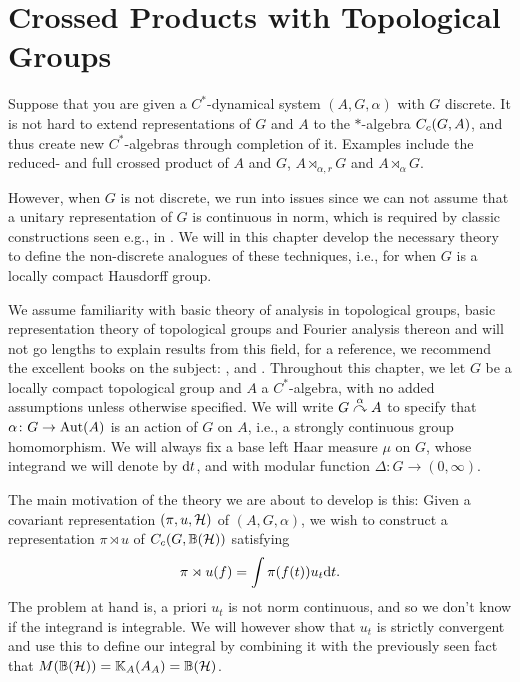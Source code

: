 \chapter{Crossed Products with Topological Groups}
Suppose that you are given a $C^*$-dynamical system $(A,G,\alpha)$ with $G$ discrete. It is not hard to extend representations of $G$ and $A$ to the $*$-algebra $C_c(G,A)$, and thus create new $C^*$-algebras through completion of it. Examples include the reduced- and full crossed product of $A$ and $G$, $A \rtimes_{\alpha,r} G$ and $A \rtimes_{\alpha} G$.

However, when $G$ is not discrete, we run into issues since we can not assume that a unitary representation of $G$ is continuous in norm, which is required by classic constructions seen e.g., in \cite{brown2008c}. We will in this chapter develop the necessary theory to define the non-discrete analogues of these techniques, i.e., for when $G$ is a locally compact Hausdorff group.

We assume familiarity with basic theory of analysis in topological groups, basic representation theory of topological groups and Fourier analysis thereon and will not go lengths to explain results from this field, for a reference, we recommend the excellent books on the subject: \cite{folland2016fourier}, \cite{berg1984harmonic} and \cite{folland2013real}. 
Throughout this chapter, we let $G$ be a locally compact topological group and $A$ a $C^*$-algebra, with no added assumptions unless otherwise specified. We will write $G \stackrel{\alpha}{\curvearrowright} A$ to specify that $\alpha \colon G \to \operatorname{Aut}(A)$ is an action of $G$ on $A$, i.e., a strongly continuous group homomorphism. We will always fix a base left Haar measure $\mu$ on $G$, whose integrand we will denote by $\mathrm{d} t$, and with modular function $\Delta \colon G \to (0,\infty)$. 

The main motivation of the theory we are about to develop is this: Given a covariant representation $(\pi,u,\mathcal{H})$ of $(A,G,\alpha)$, we wish to construct a representation $\pi \rtimes u$ of $C_c(G,\mathbb{B}(\mathcal{H}))$ satisfying 
\begin{align*}
	\pi \rtimes u (f) = \int \pi(f(t))u_t \mathrm{d} t.
\end{align*}
The problem at hand is, a priori $u_t$ is not norm continuous, and so we don't know if the integrand is integrable. We will however show that $u_t$ is strictly convergent and use this to define our integral by combining it with the previously seen fact that $M(\mathbb{B}(\mathcal{H})) = \mathbb{K}_A(A_A)= \mathbb{B}(\mathcal{H})$. 

